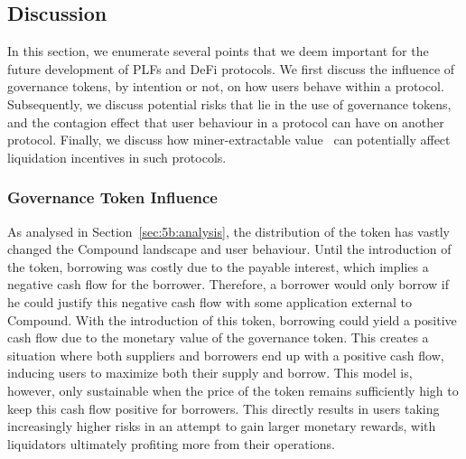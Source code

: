 \subsection{Discussion}
\label{sec:5b:discussion}
In this section, we enumerate several points that we deem important for the future development of PLFs and DeFi protocols.
We first discuss the influence of governance tokens, by intention or not, on how users behave within a protocol.
Subsequently, we discuss potential risks that lie in the use of governance tokens, and the contagion effect that user behaviour in a protocol can have on another protocol.
Finally, we discuss how miner-extractable value~\cite{daian2020flash} can potentially affect liquidation incentives in such protocols.

\subsubsection{Governance Token Influence}
As analysed in Section~\ref{sec:5b:analysis}, the distribution of the  token has vastly changed the Compound landscape and user behaviour.
Until the introduction of the token, borrowing was costly due to the payable interest, which implies a negative cash flow for the borrower. Therefore, a borrower would only borrow if he could justify this negative cash flow with some application external to Compound.
With the introduction of this token, borrowing could yield a positive cash flow due to the monetary value of the governance token.
This creates a situation where both suppliers and borrowers end up with a positive cash flow, inducing users to maximize both their supply and borrow.
This model is, however, only sustainable when the price of the  token remains sufficiently high to keep this cash flow positive for borrowers.
This directly results in users taking increasingly higher risks in an attempt to gain larger monetary rewards, with liquidators ultimately profiting more from their operations.

